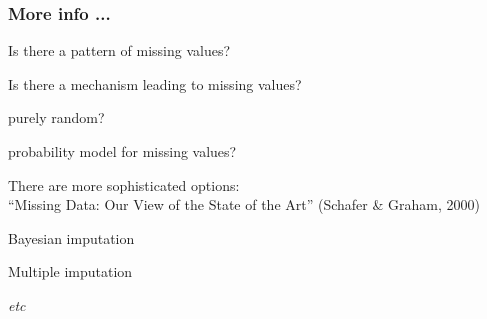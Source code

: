 \documentclass[12pt]{beamer}\usepackage[]{graphicx}\usepackage[]{color}
\begin{document}

\begin{frame}
\frametitle{More info ...}

\bi
  \item Is there a pattern of missing values?
  \item Is there a mechanism leading to missing values?
  \bi
    \item purely random?
    \item probability model for missing values?
  \ei
  \item There are more sophisticated options: \\
  ``Missing Data: Our View of the State of the Art'' (Schafer \& Graham, 2000)
  \item Bayesian imputation
  \item Multiple imputation
  \item \textit{etc}
\ei

\end{frame}

\end{document}
